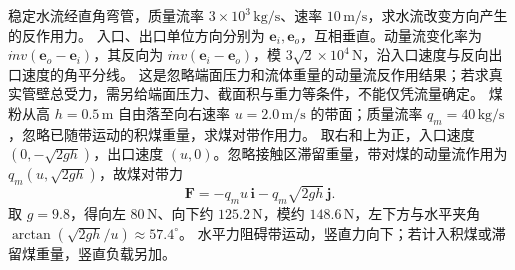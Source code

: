 \problemtext 稳定水流经直角弯管，质量流率 $3\times10^3\,\mathrm{kg/s}$、速率 $10\,\mathrm{m/s}$，求水流改变方向产生的反作用力。
\workings 入口、出口单位方向分别为 $\bm e_i,\bm e_o$，互相垂直。动量流变化率为 $\dot m v(\bm e_o-\bm e_i)$，其反向为 $\dot m v(\bm e_i-\bm e_o)$，模 $3\sqrt2\times10^4\,\mathrm N$，沿入口速度与反向出口速度的角平分线。
\crosscheck 这是忽略端面压力和流体重量的动量流反作用结果；若求真实管壁总受力，需另给端面压力、截面积与重力等条件，不能仅凭流量确定。
\problemtext 煤粉从高 $h=0.5\,\mathrm m$ 自由落至向右速率 $u=2.0\,\mathrm{m/s}$ 的带面；质量流率 $q_m=40\,\mathrm{kg/s}$，忽略已随带运动的积煤重量，求煤对带作用力。
\workings 取右和上为正，入口速度 $(0,-\sqrt{2gh})$，出口速度 $(u,0)$。忽略接触区滞留重量，带对煤的动量流作用为 $q_m(u,\sqrt{2gh})$，故煤对带力
\[
\bm F=-q_mu\,\bm i-q_m\sqrt{2gh}\,\bm j.
\]
取 $g=9.8$，得向左 $80\,\mathrm N$、向下约 $125.2\,\mathrm N$，模约 $148.6\,\mathrm N$，左下方与水平夹角 $\arctan(\sqrt{2gh}/u)\approx57.4^\circ$。
\crosscheck 水平力阻碍带运动，竖直力向下；若计入积煤或滞留煤重量，竖直负载另加。

